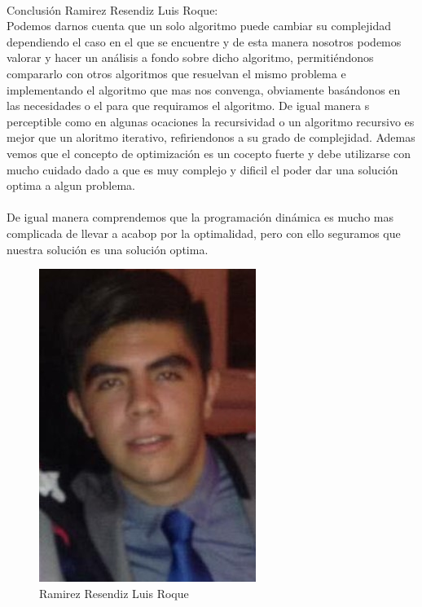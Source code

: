 \documentclass[12pt,twoside]{article}
\begin{document}
\clearpage
\\
Conclusión Ramirez Resendiz Luis Roque:\\
Podemos darnos cuenta que un solo algoritmo puede cambiar su complejidad dependiendo el caso en el que se encuentre y de esta manera nosotros podemos valorar y hacer un análisis a fondo sobre dicho algoritmo, permitiéndonos compararlo con otros algoritmos que resuelvan el mismo problema e implementando el algoritmo que mas nos convenga, obviamente basándonos en las necesidades o el para que requiramos el algoritmo. De igual manera s perceptible como en algunas ocaciones la recursividad o un algoritmo recursivo es mejor que un aloritmo iterativo, refiriendonos a su grado de complejidad. Ademas vemos que el concepto de optimización es un cocepto fuerte y debe utilizarse con mucho cuidado dado a que es muy complejo y dificil el poder dar una solución optima a algun problema.
\\
\\
De igual manera comprendemos que la programación dinámica es mucho mas complicada de llevar a acabop por la optimalidad, pero con ello seguramos que nuestra solución es una solución optima.
\begin{figure}[h!]
\centering
\includegraphics[scale=0.7]{luis1.jpg}
\caption{Ramirez Resendiz Luis Roque}
\label{fig:universe}
\end{figure}
\clearpage
\end{document}
